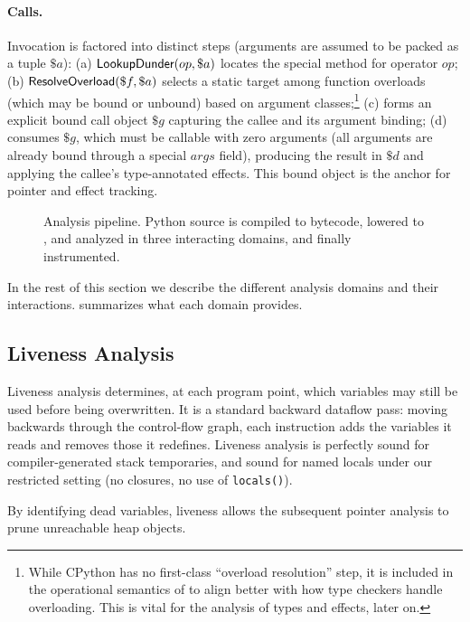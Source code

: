 \paragraph{Calls.}
Invocation is factored into distinct steps (arguments are assumed to be packed as a tuple
$\$a$): (a) $\textsf{LookupDunder}(op,\$a)$ locates the special method
for operator $op$; (b) $\textsf{ResolveOverload}(\$f,\$a)$ selects a static target among function overloads (which may be bound or unbound) based on argument classes;\footnote{While CPython has no first-class ``overload resolution'' step, it is included in the operational semantics of \spytecode to align better with how type checkers handle overloading. This is vital for the analysis of types and effects, later on.}
(c) \tBind forms an explicit bound call object $\$g$ capturing the callee and its
argument binding; (d) \tCall consumes $\$g$, which must be callable with zero arguments (all arguments are already bound through a special $args$ field), producing the result in $\$d$ and applying the callee's type-annotated effects. This bound object is the anchor for
pointer and effect tracking.

\begin{figure}[t]
    \centering
    
    \caption{Analysis pipeline. Python source is compiled to bytecode, lowered to \spytecode, and analyzed in three interacting domains, and finally instrumented.}
    \label{fig:overview}
\end{figure}

In the rest of this section we describe the different analysis domains and their interactions.  summarizes what each domain provides.

\subsection{Liveness Analysis}
\label{sec:liveness}

Liveness analysis determines, at each program point, which \spytecode variables may still be used before being overwritten.  
It is a standard backward dataflow pass: moving backwards through the control-flow graph, each instruction adds the variables it reads and removes those it redefines.  Liveness analysis is perfectly sound for compiler-generated stack temporaries, and sound for named locals under our restricted setting (no closures, no use of \texttt{locals()}).

By identifying dead variables, liveness allows the subsequent pointer analysis to prune unreachable heap objects.

